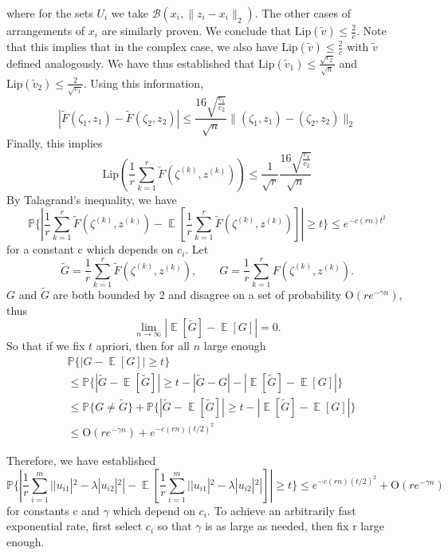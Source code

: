 \documentclass[11pt]{article}
\newcommand{\<}{\langle}
\renewcommand{\>}{\rangle}
\newcommand{\E}{\operatorname{\mathbb{E}}}
\numberwithin{equation}{section}
\newcommand{\lip}{\text{Lip}}
\begin{document}
where for the sets $U_i$ we take $\mathcal{B}(x_i,\|z_i-x_i\|_2)$. The other cases of arrangements of $x_i$ are similarly proven. We conclude that $\lip(\tilde{v}) \leq \frac{2}{c}$. Note that this implies that in the complex case, we also have $\lip(\tilde{v}) \leq \frac{2}{c}$ with $\tilde{v}$ defined analogously. We have thus established that  $\lip(\tilde{v}_1) \leq \frac{\sqrt{c_2}}{\sqrt{n}}$ and $\lip(\tilde{v}_2) \leq \frac{2}{\sqrt{c_1}}$. Using this information, 
\[
|\tilde{F}(\zeta_1,z_1) - \tilde{F}(\zeta_2,z_2)| \leq \frac{16\sqrt{\frac{c_1}{c_2}}}{\sqrt{n}}\|(\zeta_1,z_1)-(\zeta_2,z_2)\|_2
\]
Finally, this implies 
\[
\lip(\frac{1}{r}\sum_{k=1}^r \tilde{F}(\zeta^{(k)},z^{(k)}) )\leq \frac{1}{\sqrt{r}}\frac{16\sqrt{\frac{c_1}{c_2}}}{\sqrt{n}}
\]
By Talagrand's inequality, we have
\[
\mathbb{P}\{ \left|\frac{1}{r}\sum_{k=1}^r \tilde{F}(\zeta^{(k)},z^{(k)}) - \E\left[\frac{1}{r}\sum_{k=1}^r \tilde{F}(\zeta^{(k)},z^{(k)})  \right]\right| \geq t \} \leq e^{-c(rn)t^2}
\]
for a constant c which depends on $c_i$. Let 
\[
\tilde{G} = \frac{1}{r}\sum_{k=1}^r \tilde{F}(\zeta^{(k)},z^{(k)}), \qquad G = \frac{1}{r}\sum_{k=1}^r F(\zeta^{(k)},z^{(k)}).
 \]
 $G$ and $\tilde{G}$ are both bounded by 2 and disagree on a set of probability $\text{O}\left(re^{-\gamma n}\right)$, thus 
 \[
 \lim_{n \rightarrow \infty} \left| \E[\tilde{G}] - \E\left[G\right] \right|=0.
 \]
 So that if we fix $t$ apriori, then for all $n$ large enough
\begin{align*}
&\mathbb{P}\{ \left|G -\E\left[G \right]\right| \geq t  \}\\
&\leq \mathbb{P}\{ \left|\tilde{G} - \E[\tilde{G} ] \right| \geq t  - \left|\tilde{G}-G \right| - \left| \E[\tilde{G}] - \E\left[G\right] \right| \}\\
&\leq \mathbb{P}\{ G \neq \tilde{G} \} + \mathbb{P}\{ \left|\tilde{G} - \E[\tilde{G}] \right| \geq t  - \left| \E[\tilde{G}] - \E\left[G\right] \right| \}\\
&\leq  \text{O}\left(re^{-\gamma n}\right) + e^{-c(rn)(t/2)^2}
\end{align*}

Therefore, we have established
\[
\mathbb{P}\{ \left| \frac{1}{r}\sum_{i=1}^{m} | |u_{i1}|^2 - \lambda |u_{i2}|^2 |  - \E\left[\frac{1}{r}\sum_{i=1}^{m} | |u_{i1}|^2 - \lambda |u_{i2}|^2 |   \right]\right| \geq t \} \leq e^{-c(rn)(t/2)^2} + \text{O}\left(re^{-\gamma n}\right)
\]
for constants c and $\gamma$ which depend on $c_i$. To achieve an arbitrarily fast exponential rate, first select $c_i$ so that $\gamma$ is as large as needed, then fix r large enough.\\
 
\end{document}
